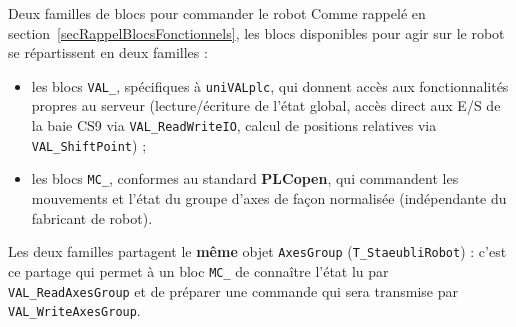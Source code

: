 \begin{UPSTIinfor}{Deux familles de blocs pour commander le robot}
Comme rappelé en section~\ref{secRappelBlocsFonctionnels}, les blocs
disponibles pour agir sur le robot se répartissent en deux familles :
\begin{itemize}
    \item les blocs \texttt{VAL\_}, spécifiques à \texttt{uniVALplc}, qui
    donnent accès aux fonctionnalités propres au serveur (lecture/écriture
    de l'état global, accès direct aux E/S de la baie CS9 via
    \texttt{VAL\_ReadWriteIO}, calcul de positions relatives via
    \texttt{VAL\_ShiftPoint}) ;
    \item les blocs \texttt{MC\_}, conformes au standard \textbf{PLCopen},
    qui commandent les mouvements et l'état du groupe d'axes de façon
    normalisée (indépendante du fabricant de robot).
\end{itemize}
Les deux familles partagent le \textbf{même} objet \texttt{AxesGroup}
(\texttt{T\_StaeubliRobot}) : c'est ce partage qui permet à un bloc
\texttt{MC\_} de connaître l'état lu par \texttt{VAL\_ReadAxesGroup} et de
préparer une commande qui sera transmise par \texttt{VAL\_WriteAxesGroup}.
\end{UPSTIinfor}

